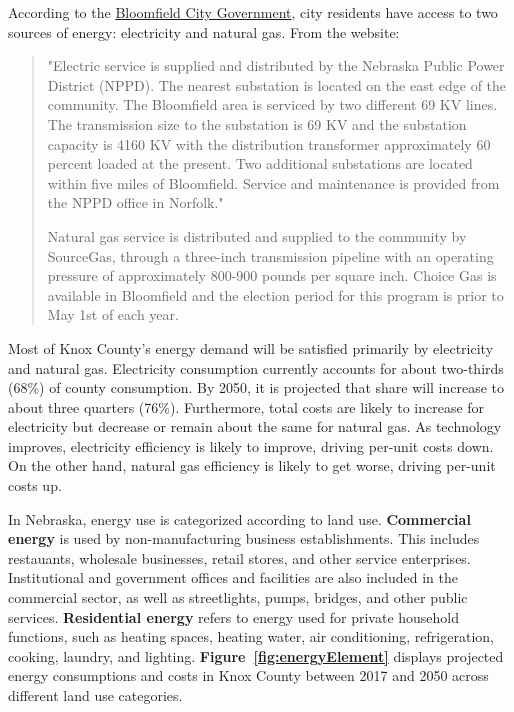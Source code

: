 \noindent According to the \href{https://bloomfieldnebraska.com/government/}{Bloomfield City Government}, city residents have access to two sources of energy: electricity and natural gas. From the website:
\begin{quote}
"Electric service is supplied and distributed by the Nebraska Public Power District (NPPD). The nearest substation is located on the east edge of the community. The Bloomfield area is serviced by two different 69 KV lines. The transmission size to the substation is 69 KV and the substation capacity is 4160 KV with the distribution transformer approximately 60 percent loaded at the present. Two additional substations are located within five miles of Bloomfield. Service and maintenance is provided from the NPPD office in Norfolk."

Natural gas service is distributed and supplied to the community by SourceGas, through a three-inch transmission pipeline with an operating pressure of approximately 800-900 pounds per square inch. Choice Gas is available in Bloomfield and the election period for this program is prior to May 1st of each year.
\end{quote}

\noindent Most of Knox County's energy demand will be satisfied primarily by electricity and natural gas. Electricity consumption currently accounts for about two-thirds (68\%) of county consumption. By 2050, it is projected that share will increase to about three quarters (76\%). Furthermore, total costs are likely to increase for electricity but decrease or remain about the same for natural gas. As technology improves, electricity efficiency is likely to improve, driving per-unit costs down. On the other hand, natural gas efficiency is likely to get worse, driving per-unit costs up.



\noindent In Nebraska, energy use is categorized according to land use. \textbf{Commercial energy} is used by non-manufacturing business establishments. This includes restauants, wholesale businesses, retail stores, and other service enterprises. Institutional and government offices and facilities are also included in the commercial sector, as well as streetlights, pumps, bridges, and other public services. \textbf{Residential energy} refers to energy used for private household functions, such as heating spaces, heating water, air conditioning, refrigeration, cooking, laundry, and lighting. \textbf{Figure~\ref{fig:energyElement}} displays projected energy consumptions and costs in Knox County between 2017 and 2050 across different land use categories.

